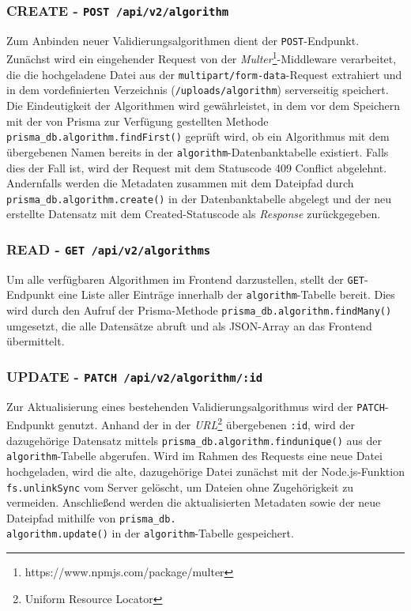 \subsubsection*{CREATE - \texttt{POST /api/v2/algorithm}}

Zum Anbinden neuer Validierungsalgorithmen dient der \texttt{POST}-Endpunkt. Zunächst wird ein eingehender Request von der \textit{Multer}\footnote{https://www.npmjs.com/package/multer}-Middleware verarbeitet, die die hochgeladene Datei aus der \texttt{multipart/form-data}-Request extrahiert und in dem vordefinierten Verzeichnis (\texttt{/uploads/algorithm}) serverseitig speichert. Die Eindeutigkeit der Algorithmen wird gewährleistet, in dem vor dem Speichern mit der von Prisma zur Verfügung gestellten Methode \texttt{prisma\_db.algorithm.findFirst()} geprüft wird, ob ein Algorithmus mit dem übergebenen Namen bereits in der \texttt{algorithm}-Datenbanktabelle existiert. Falls dies der Fall ist, wird der Request mit dem Statuscode 409 Conflict abgelehnt. Andernfalls werden die Metadaten zusammen mit dem Dateipfad durch \texttt{prisma\_db.algorithm.create()} in der Datenbanktabelle abgelegt und der neu erstellte Datensatz mit dem Created-Statuscode als \textit{Response} zurückgegeben.

\subsubsection*{READ - \texttt{GET /api/v2/algorithms}}

Um alle verfügbaren Algorithmen im Frontend darzustellen, stellt der \texttt{GET}-Endpunkt eine Liste aller Einträge innerhalb der \texttt{algorithm}-Tabelle bereit. Dies wird durch den Aufruf der Prisma-Methode \texttt{prisma\_db.algorithm.findMany()} umgesetzt, die alle Datensätze abruft und als JSON-Array an das Frontend übermittelt.

\subsubsection*{UPDATE - \texttt{PATCH /api/v2/algorithm/:id}}

Zur Aktualisierung eines bestehenden Validierungsalgorithmus wird der \texttt{PATCH}-Endpunkt genutzt. Anhand der in der \textit{URL}\footnote{Uniform Resource Locator} übergebenen \texttt{:id}, wird der dazugehörige Datensatz mittels \texttt{prisma\_db.algorithm.findunique()} aus der \texttt{algorithm}-Tabelle abgerufen. Wird im Rahmen des Requests eine neue Datei hochgeladen, wird die alte, dazugehörige Datei zunächst mit der Node.js-Funktion \texttt{fs.unlinkSync} vom Server gelöscht, um Dateien ohne Zugehörigkeit zu vermeiden. Anschließend werden die aktualisierten Metadaten sowie der neue Dateipfad mithilfe von \texttt{prisma\_db.\\ algorithm.update()} in der \texttt{algorithm}-Tabelle gespeichert.

